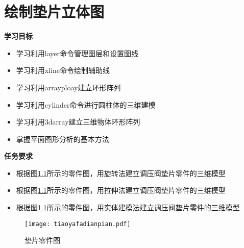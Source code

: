 \chapter{绘制垫片立体图}\label{chap:dianpian}

{\bfseries 学习目标}
\begin{itemize}
\item 学习利用layer命令管理图层和设置图线
\item 学习利用xline命令绘制辅助线
\item 学习利用arrayploay建立环形阵列
\item 学习利用cylinder命令进行圆柱体的三维建模
\item 学习利用3darray建立三维物体环形阵列
\item 掌握平面图形分析的基本方法
\end{itemize}

{\bfseries 任务要求}
\begin{itemize}
\item 根据图\ref{fig:tiaoyafadianpian}所示的零件图，用旋转法建立调压阀垫片零件的三维模型
\item 根据图\ref{fig:tiaoyafadianpian}所示的零件图，用拉伸法建立调压阀垫片零件的三维模型
\item 根据图\ref{fig:tiaoyafadianpian}所示的零件图，用实体建模法建立调压阀垫片零件的三维模型
\end{itemize}

\noindent
\begin{figure}[htbp]
\centering
\texttt{[image: tiaoyafadianpian.pdf]}
\caption{垫片零件图}\label{fig:tiaoyafadianpian}
\end{figure}

\endinput